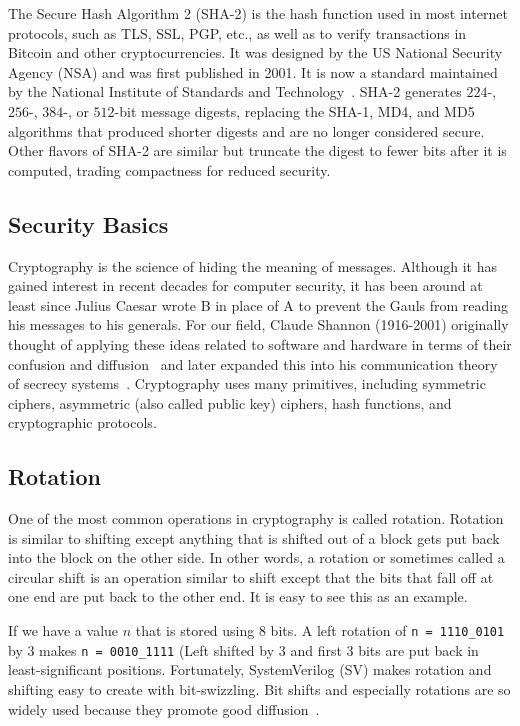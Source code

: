 \documentclass{article}
\begin{document}
The Secure Hash Algorithm 2 (SHA-2) is the hash function used in most
internet protocols, such as TLS, SSL, PGP, etc., as well as to verify
transactions in Bitcoin and other cryptocurrencies. It was designed by
the US National Security Agency (NSA) and was first published in
2001. It is now a standard maintained by the National Institute of
Standards and Technology~\cite{1250396}.
SHA-2 generates $224$-, $256$-, $384$-, or $512$-bit message digests,
replacing the SHA-1, MD4, and MD5 algorithms that produced shorter
digests and are no longer considered secure. 
Other flavors of SHA-2 are similar but truncate the digest to
fewer bits after it is computed, trading compactness for reduced
security. 

\subsection{Security Basics}

Cryptography is the science of hiding the meaning of
messages. Although it has gained interest in recent decades for
computer security, it has been around at least since Julius Caesar
wrote B in place of A to prevent the Gauls from reading his messages
to his generals.
For our field, Claude Shannon (1916-2001) originally thought of
applying these ideas related to software and hardware in terms
of their confusion and diffusion~\cite{shannon1} and later expanded this
into his communication theory of secrecy systems~\cite{6769090}.
Cryptography uses many primitives, including symmetric ciphers,
asymmetric (also called public key) ciphers, hash functions, and
cryptographic protocols.


\subsection{Rotation}
\label{swizzle.sec}

One of the most common operations in cryptography is called rotation.
Rotation is similar to shifting except anything that is shifted out of
a block gets put back into the block on the other side.  In other
words, a rotation or sometimes called a circular shift is an operation
similar to shift except that the bits that fall off at one end are put
back to the other end.  It is easy to see this as an example.

If we have a value $n$ that is stored using $8$ bits.
A left rotation of \verb!n = 1110_0101! by $3$ makes
\verb!n = 0010_1111! (Left shifted by 3 and first 3 bits are put back
in least-significant positions.  Fortunately, SystemVerilog (SV) makes
rotation and shifting easy to create with bit-swizzling.
Bit shifts and especially rotations are so widely used because they
promote good diffusion~\cite{6769090}.
\end{document}
